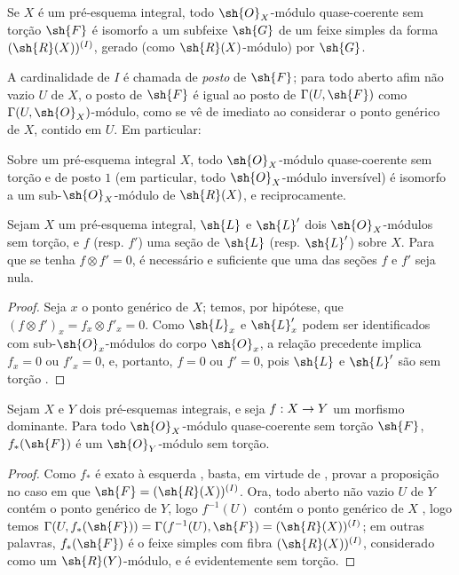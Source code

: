 \documentclass[oneside]{amsart}
\makeatletter
\newcommand{\ega@arrow}[2]{\mathchoice{#1}{#2}{#2}{#2}}
\renewcommand{\to}{\ega@arrow{\longrightarrow}{\rightarrow}}
\newcommand{\oldpage}[2][]{{\marginnote{\normalfont\textbf{#1}~|~#2}}\ignorespaces}
\let\EGAOriginalLabel\label
\renewcommand{\label}[1]{\phantomsection\EGAOriginalLabel{#1}}
\makeatother
\begin{document}
\begin{proposition}[7.4.2]
\label{I.7.4.2}
Se $X$ é um pré-esquema integral, todo $\sh{O}_X$-módulo quase-coerente sem torção $\sh{F}$ é isomorfo a um subfeixe $\sh{G}$ de um feixe simples da forma $(\sh{R}(X))^{(I)}$, gerado (como $\sh{R}(X)$-módulo) por $\sh{G}$.
\end{proposition}

A cardinalidade de $I$ é chamada de \emph{posto} de $\sh{F}$; para todo aberto afim não vazio $U$ de $X$, o posto de $\sh{F}$ é igual ao posto de $\Gamma(U,\sh{F})$ como $\Gamma(U,\sh{O}_X)$-módulo, como se vê de imediato ao considerar o ponto genérico de $X$, contido em $U$.
Em particular:

\begin{corollary}[7.4.3]
\label{I.7.4.3}
Sobre um pré-esquema integral $X$, todo $\sh{O}_X$-módulo quase-coerente sem torção e de posto $1$ (em particular, todo $\sh{O}_X$-módulo inversível) é isomorfo a um sub-$\sh{O}_X$-módulo de $\sh{R}(X)$, e reciprocamente.
\end{corollary}

\begin{corollary}[7.4.4]
\label{I.7.4.4}
Sejam $X$ um pré-esquema integral, $\sh{L}$ e $\sh{L}'$ dois $\sh{O}_X$-módulos sem torção, e $f$ (resp. $f'$) uma seção de $\sh{L}$ (resp. $\sh{L}'$) sobre $X$.
Para que se tenha $f\otimes f'=0$, é necessário e suficiente que uma das seções $f$ e $f'$ seja nula.
\end{corollary}

\begin{proof}
Seja $x$ o ponto genérico de $X$; temos, por hipótese, que $(f\otimes f')_x=f_x\otimes f'_x=0$.
Como $\sh{L}_x$ e $\sh{L}'_x$ podem ser identificados com sub-$\sh{O}_x$-módulos do corpo $\sh{O}_x$, a relação precedente implica $f_x=0$ ou $f'_x=0$, e, portanto, $f=0$ ou $f'=0$, pois $\sh{L}$ e $\sh{L}'$ são sem torção .
\end{proof}

\begin{proposition}[7.4.5]
\label{I.7.4.5}
Sejam $X$ e $Y$ dois pré-esquemas integrais, e seja $f:X\to Y$ um morfismo dominante.
Para todo $\sh{O}_X$-módulo quase-coerente sem torção $\sh{F}$, $f_*(\sh{F})$ é um $\sh{O}_Y$-módulo sem torção.
\end{proposition}

\oldpage[I]{164}
\begin{proof}
Como $f_*$ é exato à esquerda , basta, em virtude de , provar a proposição no caso em que $\sh{F}=(\sh{R}(X))^{(I)}$.
Ora, todo aberto não vazio $U$ de $Y$ contém o ponto genérico de $Y$, logo $f^{-1}(U)$ contém o ponto genérico de $X$ , logo temos $\Gamma(U,f_*(\sh{F}))=\Gamma(f^{-1}(U),\sh{F})=(\sh{R}(X))^{(I)}$; em outras palavras, $f_*(\sh{F})$ é o feixe simples com fibra $(\sh{R}(X))^{(I)}$, considerado como um $\sh{R}(Y)$-módulo, e é evidentemente sem torção.
\end{proof}
\end{document}
